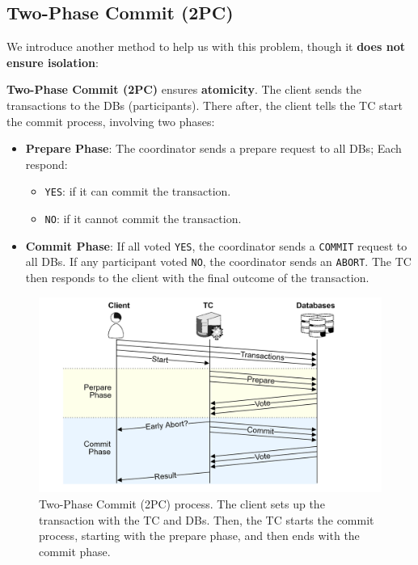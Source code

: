     \newpage 

\subsection{Two-Phase Commit (2PC)}
\noindent
We introduce another method to help us with this problem, though it \textbf{does not ensure isolation}:

\begin{Def}

    \textbf{Two-Phase Commit (2PC)} ensures \textbf{atomicity}.
    The client sends the transactions to the DBs (participants). There after, the client tells the TC start the commit process, involving two phases:
    
    \begin{itemize}
        \item \textbf{Prepare Phase}: The coordinator sends a prepare request to all DBs; Each respond:
        \begin{itemize}
            \item \texttt{YES}: if it can commit the transaction.
            \item \texttt{NO}: if it cannot commit the transaction.
        \end{itemize}
        \item \textbf{Commit Phase}: If all voted \texttt{YES}, the coordinator sends a \texttt{COMMIT} request to all DBs. If any participant voted \texttt{NO}, the coordinator sends an \texttt{ABORT}.
        The TC then responds to the client with the final outcome of the transaction.
    \end{itemize}
\end{Def}

\begin{figure}[h]
    \centering
    \includegraphics[width=\textwidth]{Sections/trans/2PC.png}
    \caption{Two-Phase Commit (2PC) process. The client sets up the transaction with the TC and DBs. Then, the TC starts the 
    commit process, starting with the prepare phase, and then ends with the commit phase.}
    \label{fig:2pc}
\end{figure}

